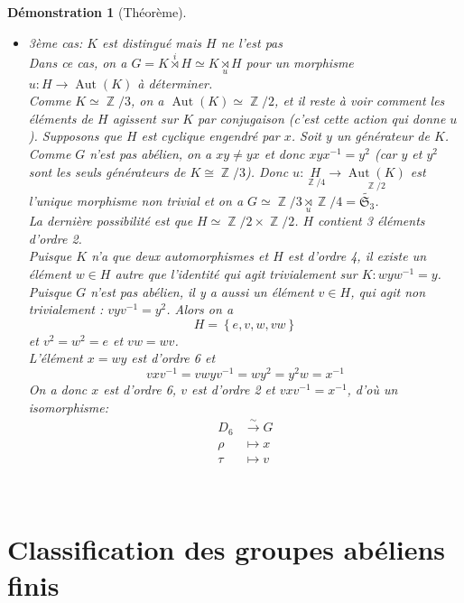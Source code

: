 \documentclass[a4paper, oneside]{report}
\theoremstyle{break}
\newtheorem*{demonstration}{Démonstration}
\newcommand{\fong}{\overset{\sim}{\rightarrow}}
\DeclareMathOperator{\Z}{\mathbb{Z}}
\renewcommand{\S}{\mathfrak{S}}
\DeclarePairedDelimiter\ens{\left\{ }{\right\} }%
\DeclareMathOperator{\Aut}{Aut}
\renewcommand{\ens}[1]{\left\{ #1 \right\} }%
\newcommand{\us}{\underset}
\newcommand{\os}{\overset}
\begin{document}
\begin{demonstration}[Théorème]
\begin{itemize}
\item 3ème cas: $K$ est distingué mais $H$ ne l'est pas\\
Dans ce cas, on a $G = K \os{i}{\rtimes} H \simeq K \us{u}{\rtimes} H$ pour un morphisme $u : H \longrightarrow \Aut(K)$ à déterminer.\\
Comme $K \simeq \Z/3$, on a $\Aut(K) \simeq \Z/2$, et il reste à voir comment les éléments de $H$ agissent sur $K$ par conjugaison (c'est cette action qui donne $u$). Supposons que $H$ est cyclique engendré par $x$. Soit $y$ un générateur de $K$. Comme $G$ n'est pas abélien, on a $xy \neq yx$ et donc $xyx^{-1} = y^2$ (car $y$ et $y^2$ sont les seuls générateurs de $K\cong \Z/3$). Donc $u : \us{\Z/4}{H} \longrightarrow \us{\Z/2}{\Aut(K)}$ est l'unique morphisme non trivial et on a $G \simeq \Z/3 \us{u}{\rtimes} \Z/4 = \tilde{\S_3}$.\\
La dernière possibilité est que $H \simeq \Z/2 \times \Z/2$. $H$ contient 3 éléments d'ordre 2.\\
Puisque $K$ n'a que deux automorphismes et $H$ est d'ordre 4, il existe un élément $w \in H$ autre que l'identité qui agit trivialement sur $K : wyw^{-1} = y$.\\
Puisque $G$ n'est pas abélien, il y a aussi un élément $v \in H$, qui agit non trivialement : $vyv^{-
1} = y^2$. Alors on a 
\[
H = \ens{e, v, w, vw}
\]
et $v^2 = w^2 = e$ et $vw = wv$.\\
L'élément $x = wy$ est d'ordre 6 et
\[
vxv^{-1} = vwyv^{-1} = wy^2 = y^2w = x^{-1}
\]
On a donc $x$ est d'ordre 6, $v$ est d'ordre 2 et $vxv^{-1} = x^{-1}$, d'où un isomorphisme:
\begin{align*}
D_6 &\fong G
\\
\rho &\mapsto x
\\
\tau &\mapsto v
\end{align*}
\end{itemize}
~
\end{demonstration}

\section{Classification des groupes abéliens finis}
\end{document}
